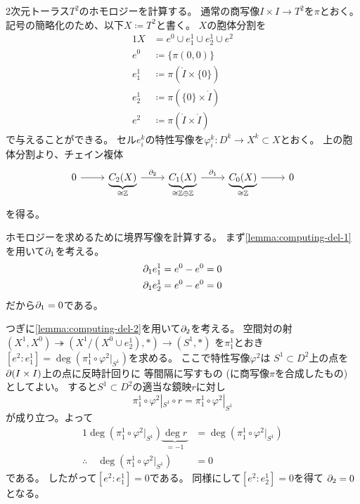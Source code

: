 \documentclass[report]{jlreq}
\begin{document}
\begin{example}[2次元トーラス]
    2次元トーラス$T^2$のホモロジーを計算する。
    通常の商写像$I \times I \to T^2$を$\pi$とおく。
    記号の簡略化のため、以下$X \coloneqq T^2$と書く。
    $X$の胞体分割を
    \begin{alignat}{1}
        X &= e^0 \cup e^1_1 \cup e^1_2 \cup e^2 \\
        e^0 &\coloneqq \{ \pi(0, 0) \} \\
        e^1_1 &\coloneqq \pi(\mathring{I} \times \{ 0 \}) \\
        e^1_2 &\coloneqq \pi(\{ 0 \} \times \mathring{I}) \\
        e^2 &\coloneqq \pi(\mathring{I} \times \mathring{I})
    \end{alignat}
    で与えることができる。
    セル$e^k_i$の特性写像を$\varphi^k_i \colon D^k \to X^k \subset X$とおく。
    上の胞体分割より、チェイン複体
    \begin{equation}
        \begin{tikzcd}
            0
                \ar{r}
                & \underbrace{C_2(X)}_{
                    \cong \Z
                }
                    \ar{r}{\del_2}
                & \underbrace{C_1(X)}_{
                    \cong \Z \oplus \Z
                }
                    \ar{r}{\del_1}
                & \underbrace{C_0(X)}_{
                    \cong \Z
                }
                    \ar{r}
                & 0
        \end{tikzcd}
    \end{equation}
    を得る。

    ホモロジーを求めるために境界写像を計算する。
    まず\cref{lemma:computing-del-1}を用いて$\partial_1$を考える。
    \begin{alignat}{1}
        \partial_1 e^1_1 &= e^0 - e^0 = 0 \\
        \partial_1 e^1_2 &= e^0 - e^0 = 0
    \end{alignat}
    だから$\partial_1 = 0$である。

    つぎに\cref{lemma:computing-del-2}を用いて$\partial_2$を考える。
    空間対の射
    $(X^1, X^0) \twoheadrightarrow (X^1 / (X^0 \cup e^1_2), *) \to (S^1, *)$
    を$\pi^1_1$とおき
    $[e^2 : e^1_1] = \deg (\pi^1_1 \circ \varphi^2|_{S^1})$を求める。
    ここで特性写像$\varphi^2$は
    $S^1 \subset D^2$上の点を
    $\partial (I \times I)$上の点に反時計回りに
    等間隔に写すもの (に商写像$\pi$を合成したもの) としてよい。
    すると$S^1 \subset D^2$の適当な鏡映$r$に対し
    \begin{equation}
        \pi^1_1 \circ \varphi^2|_{S^1} \circ r
            = \pi^1_1 \circ \varphi^2|_{S^1}
    \end{equation}
    が成り立つ。よって
    \begin{alignat}{1}
        \deg (\pi^1_1 \circ \varphi^2|_{S^1}) \underbrace{\deg r}_{= -1}
            &= \deg (\pi^1_1 \circ \varphi^2|_{S^1}) \\
        \therefore \quad \deg (\pi^1_1 \circ \varphi^2|_{S^1})
            &= 0
    \end{alignat}
    である。
    したがって$[e^2 : e^1_1] = 0$である。
    同様にして$[e^2 : e^1_2] = 0$を得て
    $\partial_2 = 0$となる。


\end{example}
\end{document}
